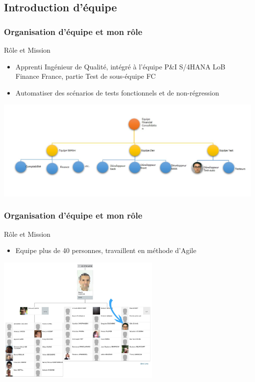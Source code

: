 \documentclass{beamer}
\begin{document}
        \subsection{Introduction d'équipe}
        \begin{frame}
        \frametitle{Organisation d'équipe et mon rôle}
            \begin{block}{Rôle et Mission}
            \begin{itemize}
                \item Apprenti Ingénieur de Qualité, intégré à l'équipe P\&I S/4HANA LoB Finance France, partie Test de sous-équipe FC
                \item Automatiser des scénarios de tests fonctionnels et de non-régression
            \end{itemize}
            
            \end{block}
            \includegraphics[width=\textwidth]{role_organisation.jpg}
        \end{frame}
        
        \begin{frame}
        \frametitle{Organisation d'équipe et mon rôle}
            \begin{block}{Rôle et Mission}
                \begin{itemize}
                    \item Equipe plus de 40 personnes, travaillent en méthode d'Agile
                \end{itemize}
            \end{block}
            \centering
            \includegraphics[width=8cm]{organisation_groupe.jpg}
        \end{frame}
        
\end{document}
